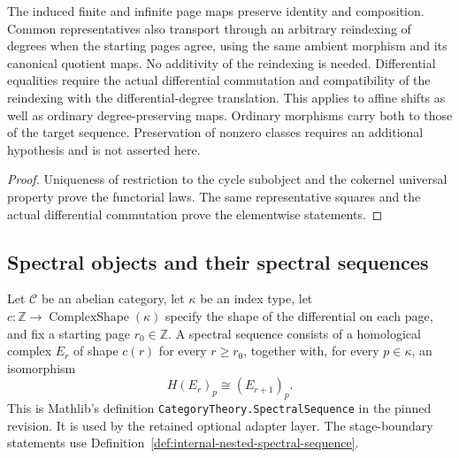 \begin{proposition}
  \label{prop:internal-page-naturality}
  \leanok
  The induced finite and infinite page maps preserve identity and composition.
  Common representatives also transport through an arbitrary reindexing of
  degrees when the starting pages agree, using the same ambient morphism
  and its canonical quotient maps. No additivity of the reindexing is needed.
  Differential equalities require the actual differential commutation and
  compatibility of the reindexing with the differential-degree translation.
  This applies to affine shifts as well as ordinary degree-preserving maps.
  Ordinary morphisms carry both to those of the target sequence. Preservation of nonzero classes requires an additional
  hypothesis and is not asserted here.
\end{proposition}
\begin{proof}
  Uniqueness of restriction to the cycle subobject and the cokernel universal
  property prove the functorial laws. The same representative squares and the
  actual differential commutation prove the elementwise statements.
  \leanok
\end{proof}

\subsection{Spectral objects and their spectral sequences}

\begin{definition}
  \label{def:mathlib-spectral-sequence}
  \mathlibok
  Let $\mathcal C$ be an abelian category, let $\kappa$ be an index type, let
  $c : \mathbb Z \to \operatorname{ComplexShape}(\kappa)$ specify the shape
  of the differential on each page, and fix a starting page $r_0\in\mathbb Z$.
  A spectral sequence consists of a homological complex $E_r$ of shape $c(r)$
  for every $r\ge r_0$, together with, for every $p\in\kappa$, an isomorphism
  \[
    H(E_r)_p \cong (E_{r+1})_p.
  \]
  This is Mathlib's definition \texttt{CategoryTheory.SpectralSequence} in
  the pinned revision.  It is used by the retained optional adapter layer. The stage-boundary
  statements use Definition~\ref{def:internal-nested-spectral-sequence}.
\end{definition}

